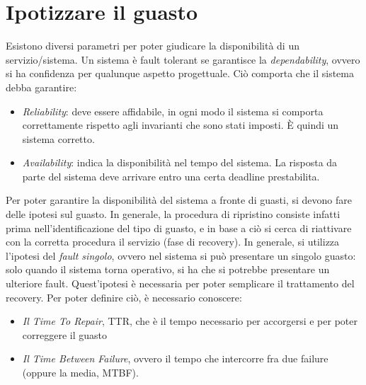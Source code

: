\section{Ipotizzare il guasto}
Esistono diversi parametri per poter giudicare la disponibilità di un
servizio/sistema.
Un sistema è fault tolerant se garantisce la \textit{dependability}, ovvero si
ha confidenza per qualunque aspetto
progettuale. Ciò comporta che il sistema debba garantire:
\begin{itemize}
 \item \textit{Reliability}: deve essere affidabile, in ogni modo il sistema si
comporta correttamente rispetto agli
invarianti che sono stati imposti. È quindi un sistema corretto.
 \item \textit{Availability}: indica la disponibilità nel tempo del sistema. La
risposta da parte del sistema deve
arrivare entro una certa deadline prestabilita.
\end{itemize}
Per poter garantire la disponibilità del sistema a fronte di guasti, si devono
fare delle ipotesi sul guasto. In
generale, la procedura di ripristino consiste infatti prima
nell'identificazione del tipo di guasto, e in base a ciò si
cerca di riattivare con la corretta procedura il servizio (fase di recovery).
In generale, si utilizza l'ipotesi del \textit{fault singolo}, ovvero nel
sistema si può presentare un singolo guasto:
solo quando il sistema torna operativo, si ha che si potrebbe presentare un
ulteriore fault. Quest'ipotesi è necessaria
per poter semplicare il trattamento del recovery. Per poter definire ciò, è
necessario conoscere:
\begin{itemize}
 \item \textit{Il Time To Repair}, TTR, che è il tempo necessario per
accorgersi e per poter correggere il guasto
 \item \textit{Il Time Between Failure}, ovvero il tempo che intercorre fra due
failure (oppure la media, MTBF).
\end{itemize}

